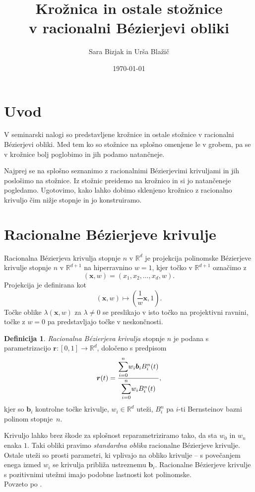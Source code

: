 \documentclass[a4paper,11pt]{article}
\title{Krožnica in ostale stožnice \\
v racionalni B\'ezierjevi obliki
}
\author{Sara Bizjak in Urša Blažič}
\date{\today}
\theoremstyle{definition}
\newtheorem*{definicija}{Definicija}
\theoremstyle{plain}
\begin{document}
\maketitle

\section{Uvod}
V seminarski nalogi so predstavljene krožnice in ostale stožnice v racionalni B\'ezierjevi obliki. Med tem ko so stožnice na splošno omenjene le v grobem, pa se v krožnice bolj poglobimo in jih podamo natančneje.

Najprej se na splošno seznanimo z racionalnimi B\'ezierjevimi krivuljami in jih poslošimo na stožnice. Iz stožnic preidemo na krožnico in si jo natančeneje pogledamo. Ugotovimo, kako lahko dobimo sklenjeno krožnico z racionalno krivuljo čim nižje stopnje in jo konstruiramo.



\section{Racionalne B\'ezierjeve krivulje}

Racionalna B\'ezierjeva krivulja stopnje $n$ v $\mathbb{R}^d$ je projekcija polinomske B\'ezierjeve krivulje stopnje $n$ v $\mathbb{R}^{d+1}$ na hiperravnino $w=1$, kjer točko v  $\mathbb{R}^{d+1}$  označimo z
$$(\boldsymbol{x},w)=(x_1,x_2,\dots,x_d,w).$$
Projekcija je definirana kot
$$(\boldsymbol{x},w)\mapsto (\frac{1}{w}\boldsymbol{x},1).$$
Točke oblike $\lambda(\boldsymbol{x}, w)$ za $\lambda\neq 0$ se preslikajo v isto točko na projektivni ravnini, točke z
$w = 0$ pa predstavljajo točke v neskončnosti.

\begin{definicija}
\emph{Racionalna B\'ezierjeva krivulja} stopnje $n$ je podana s parametrizacijo $\boldsymbol{r}:[0,1]\rightarrow \mathbb{R}^d$, določeno s predpisom
$$\boldsymbol{r}(t)=\frac{\mathlarger{\sum}_{i=0}^n w_i\boldsymbol{b}_iB_i^n(t)}{\mathlarger{\sum}_{i=0}^n w_iB_i^n(t)},$$
kjer so $\boldsymbol{b}_i$ kontrolne točke krivulje, $w_i\in\mathbb{R}^d$ uteži, $B_i^n$ pa $i$-ti Bernsteinov bazni polinom stopnje~$n$.
\end{definicija}
 
Krivuljo lahko brez škode za splošnost reparametriziramo tako, da sta $w_0$ in $w_n$ enaka $1$. Taki obliki pravimo \emph{standardna oblika} racionalne B\'ezierjeve krivulje.
Ostale uteži so prosti parametri, ki vplivajo na obliko krivulje -- s povečanjem enega izmed $w_i$ se krivulja približa ustreznemu $\boldsymbol{b}_i$. Racionalne B\'ezierjeve krivulje s pozitivnimi utežmi imajo podobne lastnosti kot polinomske. \\
Povzeto po \cite{knez}.
\end{document}
